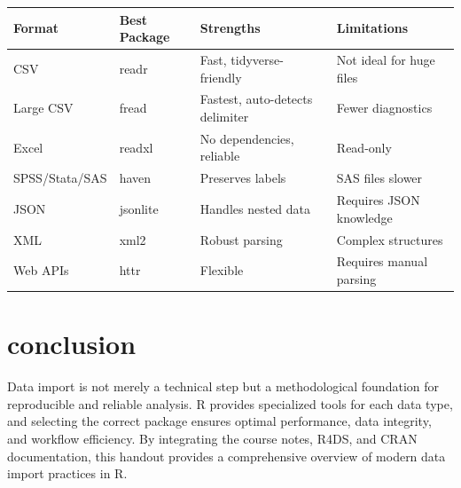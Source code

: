 \documentclass[
  doc,
  longtable,
  a4paper,
  nolmodern,
  notxfonts,
  notimes,
  colorlinks=true,linkcolor=blue,citecolor=blue,urlcolor=blue]{apa7}
\newcounter{none} %
\begin{document}
{\def\LTcaptype{none} %
\begin{longtable}[]{@{}
  >{\raggedright\arraybackslash}p{}
  >{\raggedright\arraybackslash}p{}
  >{\raggedright\arraybackslash}p{}
  >{\raggedright\arraybackslash}p{}@{}}
\toprule\noalign{}
\begin{minipage}[b]{\linewidth}\raggedright
Format
\end{minipage} & \begin{minipage}[b]{\linewidth}\raggedright
Best Package
\end{minipage} & \begin{minipage}[b]{\linewidth}\raggedright
Strengths
\end{minipage} & \begin{minipage}[b]{\linewidth}\raggedright
Limitations
\end{minipage} \\
\midrule\noalign{}
\endhead
\bottomrule\noalign{}
\endlastfoot
CSV & readr & Fast, tidyverse-friendly & Not ideal for huge files \\
Large CSV & fread & Fastest, auto-detects delimiter & Fewer
diagnostics \\
Excel & readxl & No dependencies, reliable & Read-only \\
SPSS/Stata/SAS & haven & Preserves labels & SAS files slower \\
JSON & jsonlite & Handles nested data & Requires JSON knowledge \\
XML & xml2 & Robust parsing & Complex structures \\
Web APIs & httr & Flexible & Requires manual parsing \\
\end{longtable}
}

\section{conclusion}\label{conclusion}

Data import is not merely a technical step but a methodological
foundation for reproducible and reliable analysis. R provides
specialized tools for each data type, and selecting the correct package
ensures optimal performance, data integrity, and workflow efficiency. By
integrating the course notes, R4DS, and CRAN documentation, this handout
provides a comprehensive overview of modern data import practices in R.
\end{document}
